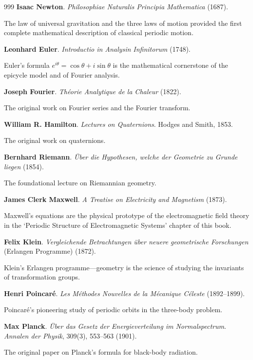 \begin{thebibliography}{999}
 \textbf{Isaac Newton}. \textit{Philosophiae Naturalis Principia Mathematica} (1687).

The law of universal gravitation and the three laws of motion provided the first complete mathematical description of classical periodic motion.

 \textbf{Leonhard Euler}. \textit{Introductio in Analysin Infinitorum} (1748).

Euler's formula $e^{i\theta} = \cos\theta + i\sin\theta$ is the mathematical cornerstone of the epicycle model and of Fourier analysis.

 \textbf{Joseph Fourier}. \textit{Th\'eorie Analytique de la Chaleur} (1822).

The original work on Fourier series and the Fourier transform.

 \textbf{William R. Hamilton}. \textit{Lectures on Quaternions}. Hodges and Smith, 1853.

The original work on quaternions.

 \textbf{Bernhard Riemann}. \textit{\"Uber die Hypothesen, welche der Geometrie zu Grunde liegen} (1854).

The foundational lecture on Riemannian geometry.

 \textbf{James Clerk Maxwell}. \textit{A Treatise on Electricity and Magnetism} (1873).

Maxwell's equations are the physical prototype of the electromagnetic field theory in the `Periodic Structure of Electromagnetic Systems' chapter of this book.

 \textbf{Felix Klein}. \textit{Vergleichende Betrachtungen \"uber neuere geometrische Forschungen} (Erlangen Programme) (1872).

Klein's Erlangen programme---geometry is the science of studying the invariants of transformation groups.

 \textbf{Henri Poincar\'e}. \textit{Les M\'ethodes Nouvelles de la M\'ecanique C\'eleste} (1892--1899).

Poincar\'e's pioneering study of periodic orbits in the three-body problem.

 \textbf{Max Planck}. \textit{\"Uber das Gesetz der Energieverteilung im Normalspectrum}. \textit{Annalen der Physik}, 309(3), 553--563 (1901).

The original paper on Planck's formula for black-body radiation.


\end{thebibliography}
